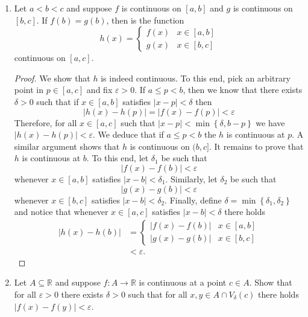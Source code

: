 \documentclass[12pt, reqno]{article}
\numberwithin{equation}{section}
\theoremstyle{definition}
\theoremstyle{remark}
\newcommand{\RR}{\mathbb{R}}
\newcommand{\set}[1]{\left\{#1\right\}}
\newcommand{\abs}[1]{\left\lvert#1\right\rvert}
\renewcommand{\epsilon}{\varepsilon}
\begin{document}
\begin{enumerate}[leftmargin=*]
	\item Let $a<b<c$ and suppose $f$ is continuous on $[a,b]$ and $g$ is continuous on $[b,c]$. If $f(b) = g(b)$, then is the function
	      \[
		      h(x) = \begin{cases}
			      f(x) & x\in [a,b] \\
			      g(x) & x\in [b,c]
		      \end{cases}
	      \]
	      continuous on $[a,c]$.
	      \begin{proof}
		      We show that $h$ is indeed continuous. To this end, pick an arbitrary point in $p \in [a,c]$ and fix $\epsilon > 0$. If $a \leq p < b$, then we know that there exists $\delta > 0$ such that if $x\in [a,b]$ satisfies $\abs{x-p} < \delta$ then
		      \[
			      \abs{h(x) - h(p)} = \abs{f(x) - f(p)} < \epsilon
		      \]
		      Therefore, for all $x\in [a,c]$ such that $\abs{x-p} < \min\set{\delta, b-p}$ we have $\abs{h(x) - h(p)} < \epsilon$. We deduce that if $a\leq p < b$ the $h$ is continuous at $p$. A similar argument shows that $h$ is continuous on $(b, c]$. It remains to prove that $h$ is continuous at $b$. To this end, let $\delta_1$ be such that
		      \[
			      \abs{f(x) - f(b)} < \epsilon
		      \]
		      whenever $x\in [a,b]$ satisfies $\abs{x-b} < \delta_1$. Similarly, let $\delta_2$ be such that
		      \[
			      \abs{g(x) - g(b)} < \epsilon
		      \]
		      whenever $x\in [b,c]$ satisfies $\abs{x-b} < \delta_2$. Finally, define $\delta = \min\set{\delta_1, \delta_2}$ and notice that whenever $x\in [a,c]$ satisfies $\abs{x-b} < \delta$ there holds
		      \begin{align*}
			      \abs{h(x) - h(b)} & = \begin{cases}
				                            \abs{f(x) - f(b)} & x\in [a,b] \\
				                            \abs{g(x) - g(b)} & x\in [b,c]
			                            \end{cases} \\
			                        & <\epsilon.
		      \end{align*}
	      \end{proof}

	\item Let $A\subseteq\RR$ and suppose $f:A\to\RR$ is continuous at a point $c\in A$. Show that for all $\epsilon > 0$ there exists $\delta > 0$ such that for all $x,y\in A\cap V_\delta(c)$ there holds $\abs{f(x) - f(y)} < \epsilon$.


\end{enumerate}
\end{document}
